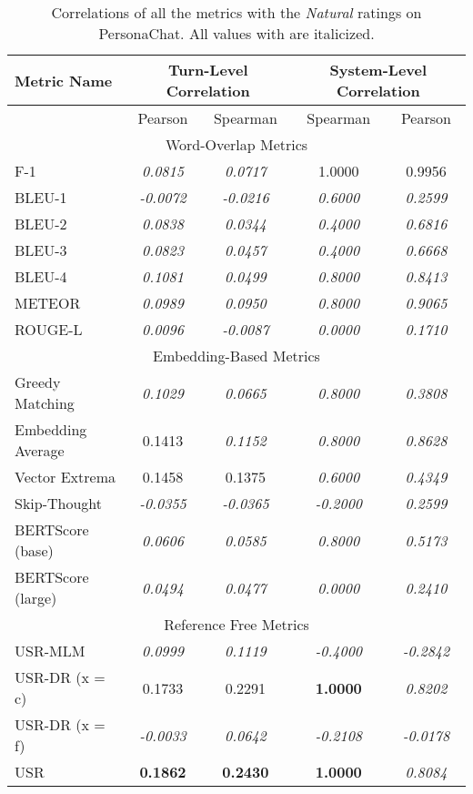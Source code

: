 \documentclass[11pt,a4paper]{article}
\begin{document}
\begin{table*}
    \centering
    \renewcommand*{\arraystretch}{1.2}
    \begin{tabular}{|l|c|c|c|c|}
    \hline
        \textbf{Metric Name} & \multicolumn{2}{|c|}{\textbf{Turn-Level Correlation}} & \multicolumn{2}{|c|}{\textbf{System-Level Correlation}}  \\ \hline
         & Pearson & Spearman & Spearman & Pearson \\ \hline
         \multicolumn{5}{|c|}{Word-Overlap Metrics} \\ \hline
F-1 & \textit{0.0815} & \textit{0.0717} & 1.0000 & 0.9956 \\
BLEU-1 & \textit{-0.0072} & \textit{-0.0216} & \textit{0.6000} & \textit{0.2599} \\
BLEU-2 & \textit{0.0838} & \textit{0.0344} & \textit{0.4000} & \textit{0.6816} \\
BLEU-3 & \textit{0.0823} & \textit{0.0457} & \textit{0.4000} & \textit{0.6668} \\
BLEU-4 & \textit{0.1081} & \textit{0.0499} & \textit{0.8000} & \textit{0.8413} \\
METEOR & \textit{0.0989} & \textit{0.0950} & \textit{0.8000} & \textit{0.9065} \\
ROUGE-L & \textit{0.0096} & \textit{-0.0087} & \textit{0.0000} & \textit{0.1710} \\\hline 
 \multicolumn{5}{|c|}{Embedding-Based Metrics} \\ \hline
Greedy Matching & \textit{0.1029} & \textit{0.0665} & \textit{0.8000} & \textit{0.3808} \\
Embedding Average & 0.1413 & \textit{0.1152} & \textit{0.8000} & \textit{0.8628} \\
Vector Extrema & 0.1458 & 0.1375 & \textit{0.6000} & \textit{0.4349} \\
Skip-Thought & \textit{-0.0355} & \textit{-0.0365} & \textit{-0.2000} & \textit{0.2599} \\
BERTScore (base) & \textit{0.0606} & \textit{0.0585} & \textit{0.8000} & \textit{0.5173} \\
BERTScore (large) & \textit{0.0494} & \textit{0.0477} & \textit{0.0000} & \textit{0.2410} \\\hline 
 \multicolumn{5}{|c|}{Reference Free Metrics} \\ \hline
USR-MLM & \textit{0.0999} & \textit{0.1119} & \textit{-0.4000} & \textit{-0.2842} \\
USR-DR (x = c) & 0.1733 & 0.2291 & \textbf{1.0000} & \textit{0.8202} \\
USR-DR (x = f) & \textit{-0.0033} & \textit{0.0642} & \textit{-0.2108} & \textit{-0.0178} \\
USR & \textbf{0.1862} & \textbf{0.2430} & \textbf{1.0000} & \textit{0.8084} \\ \hline
    \end{tabular}
    \caption{Correlations of all the metrics with the \textit{Natural} ratings on PersonaChat. All values with  are italicized. }
    
\end{table*}
\end{document}

